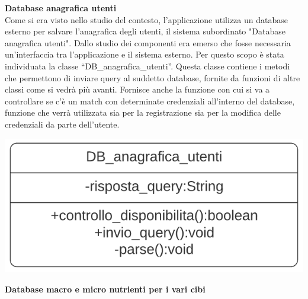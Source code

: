 \documentclass{article}
\begin{document}
      {\large\textbf{Database anagrafica utenti}}\\

      Come si era visto nello studio del contesto, l’applicazione utilizza un database esterno per salvare l’anagrafica degli utenti, il sistema subordinato "Database anagrafica utenti". Dallo studio dei componenti era emerso che fosse necessaria un’interfaccia tra l’applicazione e il sistema esterno. Per questo scopo è stata individuata la classe “DB\_anagrafica\_utenti”. Questa classe contiene i metodi che permettono di inviare query al suddetto database, fornite da funzioni di altre classi come si vedrà più avanti. Fornisce anche la funzione con cui si va a controllare se c’è un match con determinate credenziali all’interno del database, funzione che verrà utilizzata sia per la registrazione sia per la modifica delle credenziali da parte dell’utente.\\
      \begin{center}
            \includegraphics[scale=0.5]{classi/DB_anagrafica_utenti.png}
      \end{center}

      {\large\textbf{Database macro e micro nutrienti per i vari cibi}}\\
\end{document}
